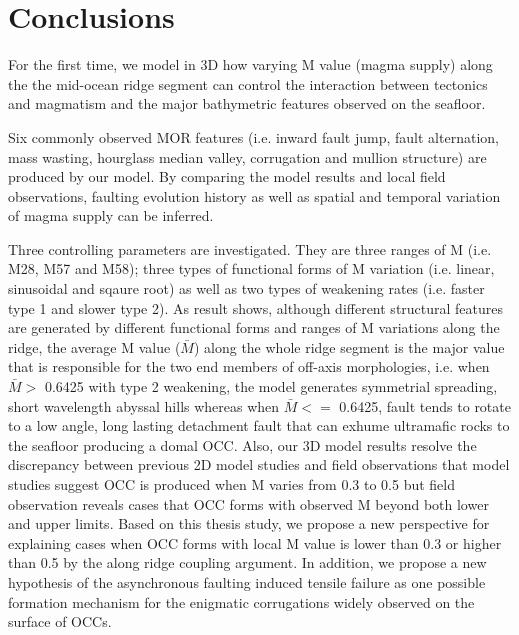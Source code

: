 \pagebreak
\section{Conclusions}
For the first time, we model in 3D how varying M value (magma supply) along the the mid-ocean ridge segment can control the interaction between tectonics and magmatism and the major bathymetric features observed on the seafloor.

Six commonly observed MOR features (i.e. inward fault jump, fault alternation, mass wasting, hourglass median valley, corrugation and mullion structure) are produced by our model. By comparing the model results and local field observations, faulting evolution history as well as spatial and temporal variation of magma supply can be inferred.

Three controlling parameters are investigated. They are three ranges of M (i.e. M28, M57 and M58); three types of functional forms of M variation (i.e. linear, sinusoidal and sqaure root) as well as two types of weakening rates (i.e. faster type 1 and slower type 2). As result shows, although different structural features are generated by different functional forms and ranges of M variations along the ridge, the average M value ($\bar{M}$) along the whole ridge segment is the major value that is responsible for the two end members of off-axis morphologies, i.e. when $\bar{M} >$ 0.6425 with type 2 weakening, the model generates symmetrial spreading, short wavelength abyssal hills whereas when $\bar{M} <=$ 0.6425, fault tends to rotate to a low angle, long lasting detachment fault that can exhume ultramafic rocks to the seafloor producing a domal OCC. Also, our 3D model results resolve the discrepancy between previous 2D model studies and field observations that model studies suggest OCC is produced when M varies from 0.3 to 0.5 but field observation reveals cases that OCC forms with observed M beyond both lower and upper limits. Based on this thesis study, we propose a new perspective for explaining cases when OCC forms with local M value is lower than 0.3 or higher than 0.5 by the along ridge coupling argument. In addition, we propose a new hypothesis of the asynchronous faulting induced tensile failure as one possible formation mechanism for the enigmatic corrugations widely observed on the surface of OCCs.




